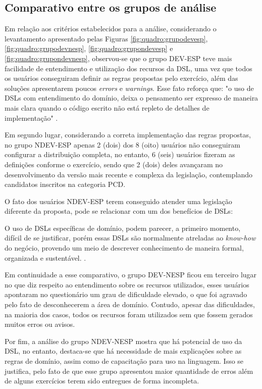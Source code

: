 \subsection{Comparativo entre os grupos de análise}
\label{sec:comparativogrupos}

Em relação aos critérios estabelecidos para a análise, considerando o levantamento apresentado pelas Figuras \ref{fig:quadro:grupodevesp}, \ref{fig:quadro:grupodevnesp}, \ref{fig:quadro:grupondevesp} e \ref{fig:quadro:grupondevnesp}, observou-se que o grupo DEV-ESP teve mais facilidade de entendimento e utilização dos recursos da DSL, uma vez que todos os usuários conseguiram definir as regras propostas pelo exercício, além das soluções apresentarem poucos \textit{errors} e \textit{warnings}. Esse fato reforça que: "o uso de DSLs com entendimento do domínio, deixa o pensamento ser expresso de maneira mais clara quando o código escrito não está repleto de detalhes de implementação"  \cite[p.41, tradução nossa]{dslengineering}.

Em segundo lugar, considerando a correta implementação das regras propostas, no grupo NDEV-ESP apenas 2 (dois) dos 8 (oito) usuários não conseguiram configurar a distribuição completa, no entanto, 6 (seis) usuários fizeram as definições conforme o exercício, sendo que 2 (dois) deles avançaram no desenvolvimento da versão mais recente e complexa da legislação, contemplando candidatos inscritos na categoria PCD. 

O fato dos usuários NDEV-ESP terem conseguido atender uma legislação diferente da proposta, pode se relacionar com um dos benefícios de DSLs: 

\begin{citacao}
O uso de DSLs específicas de domínio, podem parecer, a primeiro momento, difícil de se justificar, porém essas DSLs são normalmente atreladas ao \textit{know-how} do negócio, provendo um meio de descrever conhecimento de maneira formal, organizada e sustentável. \cite[p.43, tradução nossa]{dslengineering}.
\end{citacao}

Em continuidade a esse comparativo, o grupo DEV-NESP ficou em terceiro lugar no que diz respeito ao entendimento sobre os recursos utilizados, esses usuários apontaram no questionário um grau de dificuldade elevado, o que foi agravado pelo fato de desconhecerem a área de domínio. Contudo, apesar das dificuldades, na maioria dos casos, todos os recursos foram utilizados sem que fossem gerados muitos erros ou avisos. 

Por fim, a análise do grupo NDEV-NESP mostra que há potencial de uso da DSL, no entanto, destaca-se que há necessidade de mais explicações sobre as regras de domínio, assim como de capacitação para uso na linguagem. Isso se justifica, pelo fato de que esse grupo apresentou maior quantidade de erros além de alguns exercícios terem sido entregues de forma incompleta.

